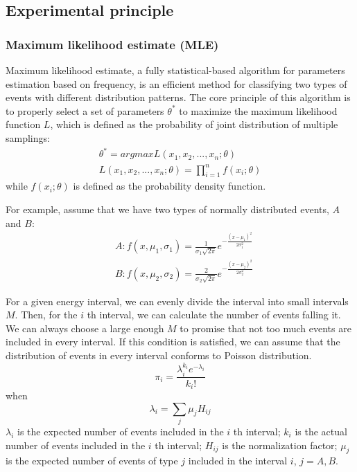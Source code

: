 \documentclass[10pt,a4paper,twocolumn,twoside,UTF8]{article}
\begin{document}
	\subsection{Experimental principle\autocite{shenGeneralPhysicsLaboratory2015}}
		\subsubsection{Maximum likelihood estimate (MLE)}
		
		Maximum likelihood estimate, a fully statistical-based algorithm for parameters estimation based on frequency, 
		is an efficient method for classifying two types of events with different distribution patterns. 
		The core principle of this algorithm is to properly select a set of parameters $\theta^*$ to maximize the maximum likelihood function $L$, 
		which is defined as the probability of joint distribution of multiple samplings:
		\begin{gather}
			\theta^* = argmaxL(x_1, x_2, ..., x_n;\theta) \label{eq:1.1} \\
			L(x_1, x_2, ..., x_n;\theta) = \prod_{i=1}^n f(x_i;\theta) \label{eq:1.2}
		\end{gather}
		while $f(x_i;\theta)$ is defined as the probability density function.

		For example, assume that we have two types of normally distributed events, $A$ and $B$:
		\begin{align*}
			&A: f(x, \mu_1, \sigma_1) = \frac{1}{\sigma_1\sqrt{2\pi}}e^{{-\frac{(x-\mu_1)^2}{2\sigma_1^2}}} \\
			&B: f(x, \mu_2, \sigma_2) = \frac{2}{\sigma_2\sqrt{2\pi}}e^{{-\frac{(x-\mu_2)^2}{2\sigma_2^2}}}
			\label{eq:1.3}
		\end{align*}

		For a given energy interval, we can evenly divide the interval into small intervals $M$. 
		Then, for the $i$ th interval, we can calculate the number of events falling it. 
		We can always choose a large enough $M$ to promise that not too much events are included in every interval. 
		If this condition is satisfied, we can assume that the distribution of events in every interval conforms to Poisson distribution. 
		\begin{equation}
			\pi_i = \frac{\lambda_i^{k_i}e^{-\lambda_i}}{k_i!}
			\label{eq:1.4}
		\end{equation}
		when
		\begin{equation}
			\lambda_i = \sum_{j} \mu_j H_{ij}
			\label{eq:1.5}
		\end{equation}
		$\lambda_i$ is the expected number of events included in the $i$ th interval; $k_i$ is the actual number of events included in the $i$ th interval; 
		$H_{ij}$ is the normalization factor; $\mu_j$ is the expected number of events of type $j$ included in the interval $i$, $j=A,B$.
\end{document}
